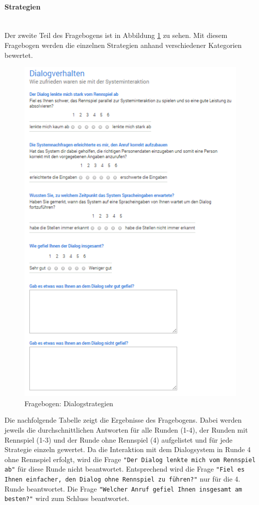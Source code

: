 \documentclass[12pt,a4paper]{scrartcl}
\begin{document}
\paragraph{Strategien}
~\\
Der zweite Teil des Fragebogens ist in Abbildung \ref{fbstrategien1} zu sehen. 
Mit diesem Fragebogen werden die einzelnen Strategien anhand verschiedener Kategorien bewertet.
\begin{figure}[H]
\begin{center}
\includegraphics[width=12cm]{fbdialog.png}
\caption{Fragebogen: Dialogstrategien}
\label{fbstrategien1}
\end{center}
\end{figure}
Die nachfolgende Tabelle zeigt die Ergebnisse des Fragebogens. Dabei werden jeweils die durchschnittlichen Antworten für alle Runden (1-4), der Runden mit Rennspiel (1-3) und der Runde ohne Rennspiel (4) aufgelistet und für jede Strategie einzeln gewertet.
\newline \newline
Da die Interaktion mit dem Dialogsystem in Runde 4 ohne Rennspiel erfolgt, wird die Frage \texttt{"Der Dialog lenkte mich vom Rennspiel ab"} für diese Runde nicht beantwortet. Entsprechend wird die Frage \texttt{"Fiel es Ihnen einfacher, den Dialog ohne Rennspiel zu führen?"} nur für die 4. Runde beantwortet.
Die Frage \texttt{"Welcher Anruf gefiel Ihnen insgesamt am besten?"} wird zum Schluss beantwortet.
\newpage
\end{document}
